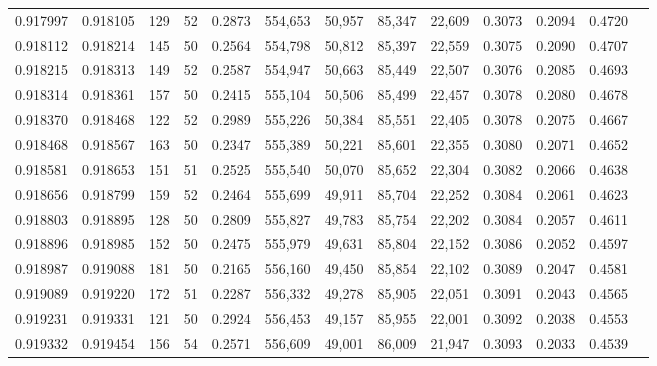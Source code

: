 \begin{tabular}{rrrrrrrrrrrrr}
0.917997 & 0.918105 &   129 &  52 &                                     0.2873 & 554,653 &  50,957 &  85,347 &  22,609 & 0.3073 & 0.2094 & 0.4720 \\
0.918112 & 0.918214 &   145 &  50 &                                     0.2564 & 554,798 &  50,812 &  85,397 &  22,559 & 0.3075 & 0.2090 & 0.4707 \\
0.918215 & 0.918313 &   149 &  52 &                                     0.2587 & 554,947 &  50,663 &  85,449 &  22,507 & 0.3076 & 0.2085 & 0.4693 \\
0.918314 & 0.918361 &   157 &  50 &                                     0.2415 & 555,104 &  50,506 &  85,499 &  22,457 & 0.3078 & 0.2080 & 0.4678 \\
0.918370 & 0.918468 &   122 &  52 &                                     0.2989 & 555,226 &  50,384 &  85,551 &  22,405 & 0.3078 & 0.2075 & 0.4667 \\
0.918468 & 0.918567 &   163 &  50 &                                     0.2347 & 555,389 &  50,221 &  85,601 &  22,355 & 0.3080 & 0.2071 & 0.4652 \\
0.918581 & 0.918653 &   151 &  51 &                                     0.2525 & 555,540 &  50,070 &  85,652 &  22,304 & 0.3082 & 0.2066 & 0.4638 \\
0.918656 & 0.918799 &   159 &  52 &                                     0.2464 & 555,699 &  49,911 &  85,704 &  22,252 & 0.3084 & 0.2061 & 0.4623 \\
0.918803 & 0.918895 &   128 &  50 &                                     0.2809 & 555,827 &  49,783 &  85,754 &  22,202 & 0.3084 & 0.2057 & 0.4611 \\
0.918896 & 0.918985 &   152 &  50 &                                     0.2475 & 555,979 &  49,631 &  85,804 &  22,152 & 0.3086 & 0.2052 & 0.4597 \\
0.918987 & 0.919088 &   181 &  50 &                                     0.2165 & 556,160 &  49,450 &  85,854 &  22,102 & 0.3089 & 0.2047 & 0.4581 \\
0.919089 & 0.919220 &   172 &  51 &                                     0.2287 & 556,332 &  49,278 &  85,905 &  22,051 & 0.3091 & 0.2043 & 0.4565 \\
0.919231 & 0.919331 &   121 &  50 &                                     0.2924 & 556,453 &  49,157 &  85,955 &  22,001 & 0.3092 & 0.2038 & 0.4553 \\
0.919332 & 0.919454 &   156 &  54 &                                     0.2571 & 556,609 &  49,001 &  86,009 &  21,947 & 0.3093 & 0.2033 & 0.4539 \\

\end{tabular}
